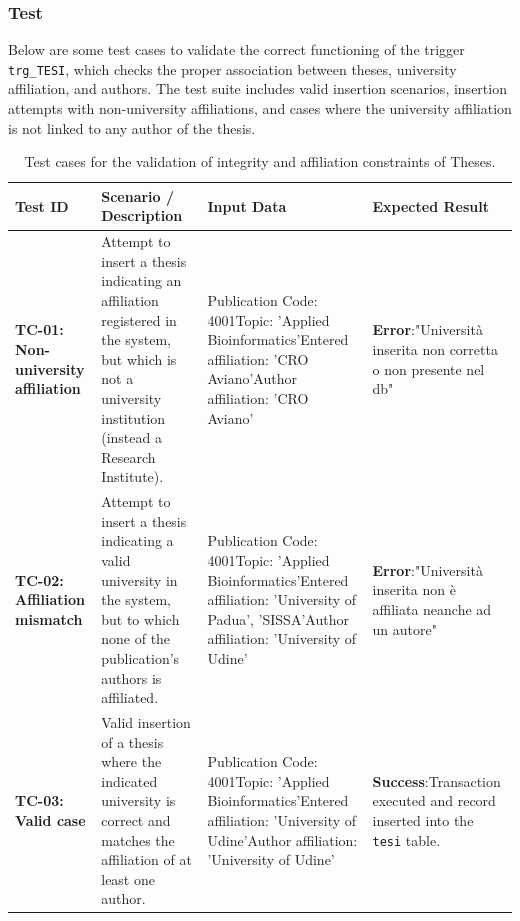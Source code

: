 \documentclass[a4paper,12pt]{article}
\begin{document}
\subsubsection*{Test}
Below are some test cases to validate the correct functioning of the trigger \texttt{trg\_TESI}, which checks the proper association between theses, university affiliation, and authors. The test suite includes valid insertion scenarios, insertion attempts with non-university affiliations, and cases where the university affiliation is not linked to any author of the thesis.
\begin{table}[htbp]
\centering
\small
\caption{Test cases for the validation of integrity and affiliation constraints of Theses.}
\label{tab:casi_test_tesi}
\begin{tabularx}{\textwidth}{X X X X}
\toprule
\textbf{Test ID} & \textbf{Scenario / Description} & \textbf{Input Data} & \textbf{Expected Result} \\ 
\midrule
\textbf{TC-01: Non-university affiliation} & 
Attempt to insert a thesis indicating an affiliation registered in the system, but which is not a university institution (instead a Research Institute). & 
Publication Code: 4001\newline Topic: 'Applied Bioinformatics'\newline Entered affiliation: 'CRO Aviano'\newline Author affiliation: 'CRO Aviano' & 
\textbf{Error}:\newline "Università inserita non corretta o non presente nel db" \\ 
\midrule
\textbf{TC-02: Affiliation mismatch} & 
Attempt to insert a thesis indicating a valid university in the system, but to which none of the publication's authors is affiliated. & 
Publication Code: 4001\newline Topic: 'Applied Bioinformatics'\newline Entered affiliation: 'University of Padua', 'SISSA'\newline Author affiliation: 'University of Udine' & 
\textbf{Error}:\newline "Università inserita non è affiliata neanche ad un autore" \\ 
\midrule
\textbf{TC-03: Valid case} & 
Valid insertion of a thesis where the indicated university is correct and matches the affiliation of at least one author. & 
Publication Code: 4001\newline Topic: 'Applied Bioinformatics'\newline Entered affiliation: 'University of Udine'\newline Author affiliation: 'University of Udine' & 
\textbf{Success}:\newline Transaction executed and record inserted into the \texttt{tesi} table. \\ 
\bottomrule
\end{tabularx}
\end{table}
\newpage
\end{document}
